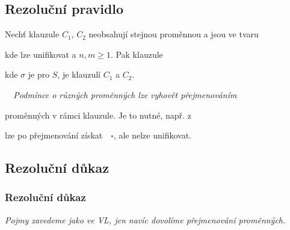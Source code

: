 \subsection{Rezoluční pravidlo}\todo

Nechť klauzule $C_1$, $C_2$ neobsahují stejnou proměnnou  a jsou ve tvaru
\vspace{-2mm}

\vspace{-6mm}
kde  lze unifikovat a $n,m\ge 1$. Pak klauzule
\vspace{-2mm}

\vspace{-6mm}
kde $\sigma$ je  pro $S$, je  klauzulí $C_1$ a $C_2$.
\bigskip

\smallskip

\smallskip

\bigskip

{\it {}\ \ Podmínce o různých proměnných lze vyhovět přejmenováním
\smallskip

proměnných v rámci klauzule. Je to nutné, např. z 
\smallskip

lze po přejmenování získat\ \ $\square$, ale  nelze unifikovat.}



\subsection{Rezoluční důkaz}\todo


\subsubsection*{Rezoluční důkaz}
    {\it Pojmy zavedeme jako ve VL, jen navíc dovolíme přejmenování proměnných.}
    \smallskip
    
